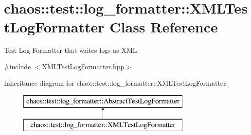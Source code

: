 \hypertarget{classchaos_1_1test_1_1log__formatter_1_1_x_m_l_test_log_formatter}{}\section{chaos\+:\+:test\+:\+:log\+\_\+formatter\+:\+:X\+M\+L\+Test\+Log\+Formatter Class Reference}
\label{classchaos_1_1test_1_1log__formatter_1_1_x_m_l_test_log_formatter}


Test Log Formatter that writes logs as X\+M\+L.  




{\ttfamily \#include $<$X\+M\+L\+Test\+Log\+Formatter.\+hpp$>$}

Inheritance diagram for chaos\+:\+:test\+:\+:log\+\_\+formatter\+:\+:X\+M\+L\+Test\+Log\+Formatter\+:\begin{figure}[H]
\begin{center}
\leavevmode
\includegraphics[height=2.000000cm]{classchaos_1_1test_1_1log__formatter_1_1_x_m_l_test_log_formatter}
\end{center}
\end{figure}
